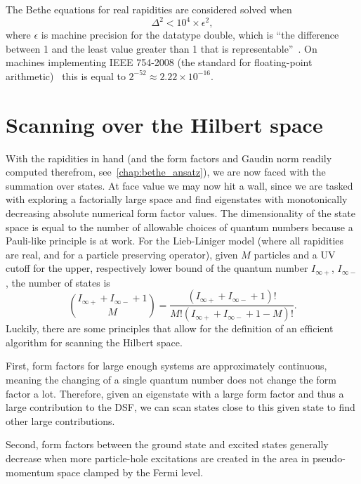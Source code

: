 \documentclass[11pt, a4paper]{report} %
\begin{document}
The Bethe equations for real rapidities are considered solved when~\cite{Caux2009}
\begin{equation}
	\Delta^2 < 10^4 \times \epsilon^2,
\end{equation}
where \(\epsilon\) is machine precision for the datatype double, which is ``the difference between 1 and the least value greater than 1 that is representable''~\cite{cppstandard2016}.
On machines implementing IEEE 754-2008 (the standard for floating-point arithmetic)~\cite{ieeefp2008} this is equal to \({2^{-52} \approx 2.22 \times 10^{-16}}\).


\section{Scanning over the Hilbert space}

With the rapidities in hand (and the form factors and Gaudin norm readily computed therefrom, see~\cref{chap:bethe_ansatz}), we are now faced with the summation over states.
At face value we may now hit a wall, since we are tasked with exploring a factorially large space and find eigenstates with monotonically decreasing absolute numerical form factor values.
The dimensionality of the state space is equal to the number of allowable choices of quantum numbers because a Pauli-like principle is at work.
For the Lieb-Liniger model (where all rapidities are real, and for a particle preserving operator), given $M$ particles and a UV cutoff for the upper, respectively lower bound of the quantum number $I_{\infty+}$, $I_{\infty-}$, the number of states is~\cite{Caux2009}
\begin{equation}
  \binom{I_{\infty+} + I_{\infty-} + 1}{M} = \frac{(I_{\infty+} + I_{\infty-} + 1)!}{M!(I_{\infty+} + I_{\infty-} + 1 - M)!}.
\end{equation}
Luckily, there are some principles that allow for the definition of an efficient algorithm for scanning the Hilbert space.

First, form factors for large enough systems are approximately continuous, meaning the changing of a single quantum number does not change the form factor a lot.
Therefore, given an eigenstate with a large form factor and thus a large contribution to the DSF, we can scan states close to this given state to find other large contributions.

Second, form factors between the ground state and excited states generally decrease when more particle-hole excitations are created in the area in pseudo-momentum space clamped by the Fermi level.
\end{document}
